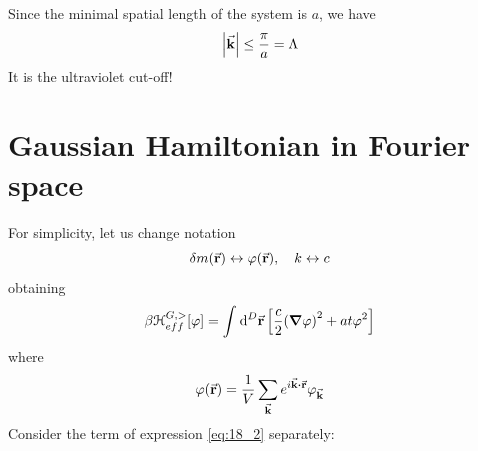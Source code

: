 \documentclass[../main/main.tex]{subfiles}
\begin{document}
\begin{remark}
Since the minimal spatial length of the system is \( a \), we have
\begin{equation*}
\abs{\va{k}} \le \frac{\pi }{a} = \Lambda
\end{equation*}
It is the ultraviolet cut-off!
\end{remark}





\section{Gaussian Hamiltonian in Fourier space}
For simplicity, let us change notation
\begin{equation}
  \delta m (\va{r}) \leftrightarrow \varphi (\va{r}), \quad k \leftrightarrow c
\end{equation}
obtaining
\begin{equation}
  \beta \mathcal{H}_{eff}^{G,>} [\varphi ]= \int_{}^{} \dd[D]{\va{r}} \qty[\frac{c}{2} \qty(\grad \varphi )^2 + a t \varphi  ^2 ]
  \label{eq:18_2}
\end{equation}
where
\begin{equation}
  \varphi (\va{r}) = \frac{1}{V} \sum_{\va{k}}^{} e^{i \va{k} \vdot \va{r}} \varphi _{\va{k}}
\end{equation}
Consider the term of expression \eqref{eq:18_2} separately:
\end{document}
